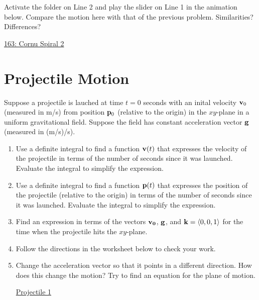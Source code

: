 \documentclass{ximera}
\begin{document}
\begin{question}  \label{Q34rr4tr354}
Activate the folder on Line 2 and play the slider on Line 1 in the animation below. Compare the motion here with that of the previous problem. Similarities? Differences?

\begin{onlineOnly}
    \begin{center}
\end{center}
\end{onlineOnly}


\href{https://www.desmos.com/3d/6jqsfb5ols}{163: Cornu Spiral 2}

\end{question}


\section{Projectile Motion}
\begin{question}  \label{Qerwer}
Suppose a projectile is lauched at time $t=0$ seconds with an inital velocity ${\bf v}_0$ (measured in m/s) from position ${\bf p}_0$ (relative to the origin) in the $xy$-plane in a uniform gravitational field. Suppose the field has constant acceleration vector ${\bf g}$ (measured in (m/s)/s).

\begin{enumerate}

\item Use a definite integral to find a function ${\bf v}(t)$ that expresses the velocity of the projectile in terms of the number of seconds since it was launched. Evaluate the integral to simplify the expression.

\item Use a definite integral to find a function ${\bf p}(t)$ that expresses the position of the projectile (relative to the origin) in terms of the number of seconds since it was launched. Evaluate the integral to simplify the expression.

\item Find an expression in terms of the vectors ${\bf v_0}$, ${\bf g}$, and ${\bf k}=\langle 0,0,1 \rangle$ for the time when the projectile hits the $xy$-plane.

\item Follow the directions in the worksheet below to check your work.

\item Change the acceleration vector so that it points in a different direction. How does this change the motion? Try to find an equation for the plane of motion. 

\begin{onlineOnly}
    \begin{center}
\end{center}
\end{onlineOnly}

\href{https://www.desmos.com/3d/csovv2cwn4}{Projectile 1}

\end{enumerate} 

\end{question}
\end{document}
